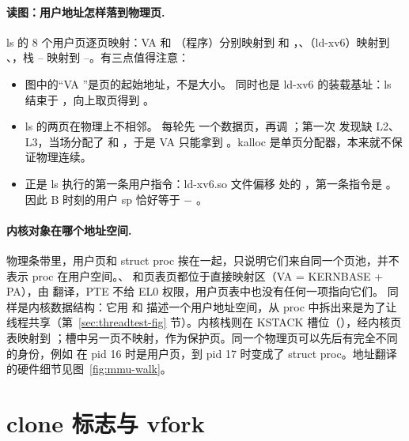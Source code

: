 \paragraph{读图：用户地址怎样落到物理页.} ls 的 8 个用户页逐页映射：VA  和 （程序）分别映射到  和 ，、（ld-xv6）映射到 、，栈 -- 映射到 --。有三点值得注意：
\begin{itemize}
  \item 图中的“VA ”是页的起始地址，不是大小。 同时也是 ld-xv6 的装载基址：ls 结束于 ，向上取页得到 。
  \item ls 的两页在物理上不相邻。 每轮先  一个数据页，再调 ；第一次  发现缺 L2、L3，当场分配了  和 ，于是 VA  只能拿到 。kalloc 是单页分配器，本来就不保证物理连续。
  \item {} 正是 ls 执行的第一条用户指令：ld-xv6.so 文件偏移  处的 ，第一条指令是 。因此 B 时刻的用户 sp  恰好等于  $-$ 。
\end{itemize}

\paragraph{内核对象在哪个地址空间.} 物理条带里，用户页和 struct proc 挨在一起，只说明它们来自同一个页池，并不表示 proc 在用户空间。、 和页表页都位于直接映射区（VA = KERNBASE + PA），由  翻译，PTE 不给 EL0 权限，用户页表中也没有任何一项指向它们。 同样是内核数据结构：它用  和  描述一个用户地址空间，从 proc 中拆出来是为了让线程共享（第~\ref{sec:threadtest-fig} 节）。内核栈则在 KSTACK 槽位（），经内核页表映射到 ；槽中另一页不映射，作为保护页。同一个物理页可以先后有完全不同的身份，例如  在 pid 16 时是用户页，到 pid 17 时变成了 struct proc。地址翻译的硬件细节见图~\ref{fig:mmu-walk}。

\section{clone 标志与 vfork}
\label{sec:clone-flags}

